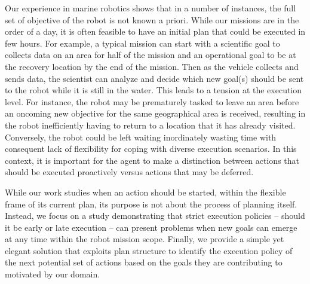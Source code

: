 Our experience in marine robotics shows that in a number of instances,
the full set of objective of the robot is not known a priori. While
our missions are in the order of a day, it is often feasible to have
an initial plan that could be executed in few hours. For example, a
typical mission can start with a scientific goal to collects data on
an area for half of the mission and an operational goal to be at the
recovery location by the end of the mission. Then as the vehicle
collects and sends data, the scientist can analyze and decide which
new goal(s) should be sent to the robot while it is still in the
water. This leads to a tension at the execution level.  For instance,
the robot may be prematurely tasked to leave an area before an
oncoming new objective for the same geographical area is received,
resulting in the robot inefficiently having to return to a location
that it has already visited. Conversely, the robot could be left
waiting inordinately wasting time with consequent lack of flexibility
for coping with diverse execution scenarios. In this context, it is
important for the agent to make a distinction between actions that
should be executed proactively versus actions that may be deferred.

While our work studies when an action should be started, within the
flexible frame of its current plan, its purpose is not about the
process of planning itself. Instead, we focus on a study demonstrating
that strict execution policies -- should it be early or late execution
-- can present problems when new goals can emerge at any time within
the robot mission scope. Finally, we provide a simple yet elegant
solution that exploits plan structure to identify the execution policy
of the next potential set of actions based on the goals they are
contributing to motivated by our domain.



